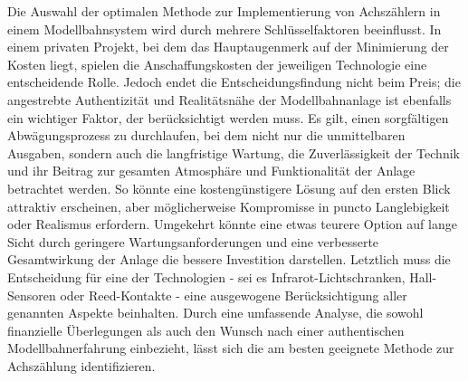 Die Auswahl der optimalen Methode zur Implementierung von Achszählern in einem Modellbahnsystem wird durch mehrere Schlüsselfaktoren beeinflusst. In einem privaten Projekt, bei dem das Hauptaugenmerk auf der Minimierung der Kosten liegt, spielen die Anschaffungskosten der jeweiligen Technologie eine entscheidende Rolle. Jedoch endet die Entscheidungsfindung nicht beim Preis; die angestrebte Authentizität und Realitätsnähe der Modellbahnanlage ist ebenfalls ein wichtiger Faktor, der berücksichtigt werden muss.
\newline
Es gilt, einen sorgfältigen Abwägungsprozess zu durchlaufen, bei dem nicht nur die unmittelbaren Ausgaben, sondern auch die langfristige Wartung, die Zuverlässigkeit der Technik und ihr Beitrag zur gesamten Atmosphäre und Funktionalität der Anlage betrachtet werden. So könnte eine kostengünstigere Lösung auf den ersten Blick attraktiv erscheinen, aber möglicherweise Kompromisse in puncto Langlebigkeit oder Realismus erfordern. Umgekehrt könnte eine etwas teurere Option auf lange Sicht durch geringere Wartungsanforderungen und eine verbesserte Gesamtwirkung der Anlage die bessere Investition darstellen.
\newline
Letztlich muss die Entscheidung für eine der Technologien - sei es Infrarot-Lichtschranken, Hall-Sensoren oder Reed-Kontakte - eine ausgewogene Berücksichtigung aller genannten Aspekte beinhalten. Durch eine umfassende Analyse, die sowohl finanzielle Überlegungen als auch den Wunsch nach einer authentischen Modellbahnerfahrung einbezieht, lässt sich die am besten geeignete Methode zur Achszählung identifizieren.
